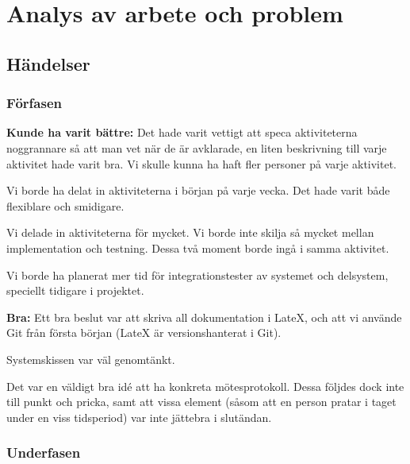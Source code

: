 
\section{Analys av arbete och problem}

\subsection{Händelser}
\subsubsection{Förfasen}

\textbf{Kunde ha varit bättre:}
\newline
Det hade varit vettigt att speca aktiviteterna noggrannare så att man vet när de är avklarade, en liten beskrivning till varje aktivitet hade varit bra. Vi skulle kunna ha haft fler personer på varje aktivitet.
\newline

Vi borde ha delat in aktiviteterna i början på varje vecka. Det hade varit både flexiblare och smidigare.
\newline

Vi delade in aktiviteterna för mycket. Vi borde inte skilja så mycket mellan implementation och testning. Dessa två moment borde ingå i samma aktivitet.
\newline

Vi borde ha planerat mer tid för integrationstester av systemet och delsystem, speciellt tidigare i projektet.
\newline 

\textbf{Bra:}
\newline
Ett bra beslut var att skriva all dokumentation i LateX, och att vi använde Git från första början (LateX är versionshanterat i Git).
\newline

Systemskissen var väl genomtänkt.
\newline

Det var en väldigt bra idé att ha konkreta mötesprotokoll. Dessa följdes dock inte till punkt och pricka, samt att vissa element (såsom att en person pratar i taget under en viss tidsperiod) var inte jättebra i slutändan.

\subsubsection{Underfasen}

